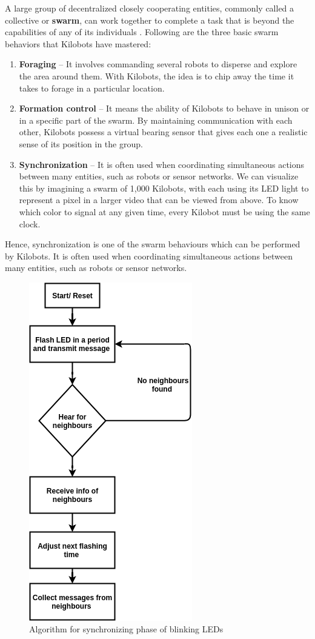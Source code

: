 \noindent A large group of decentralized closely cooperating entities, commonly called a collective or \textbf{swarm}, can work together to complete a task that is beyond the capabilities of any of its individuals \cite{rubenstein2014kilobot}. Following are the three basic swarm behaviors \cite{rubenstein2014kilobot} that Kilobots have mastered: 
\begin{enumerate}
	\item  \textbf{Foraging} -- It involves commanding several robots to disperse and explore the area around them. With Kilobots, the idea is to chip away the time it takes to forage in a particular location. 
	\item  \textbf{Formation control} -- It means the ability of Kilobots to behave in unison or in a specific part of the swarm. By maintaining communication with each other, Kilobots possess a virtual bearing sensor that gives each one a realistic sense of its position in the group. 
	\item \textbf{Synchronization} -- It is often used when coordinating simultaneous actions between many entities, such as robots or sensor networks. We can  visualize this by imagining a swarm of 1,000 Kilobots, with each using its LED light to represent a pixel in a larger video that can be viewed from above. To know which color to signal at any given time, every Kilobot must be using the same clock.
\end{enumerate}
Hence, synchronization is one of the swarm behaviours which can be performed by Kilobots. It is often used when coordinating simultaneous
actions between many entities, such as robots or sensor networks.\\

\begin{figure}[H]
    \centering
	\includegraphics[scale=0.8]{images/sync-algo}
	\caption{Algorithm for synchronizing phase of blinking LEDs }
	\label{fig:sync}
\end{figure}

